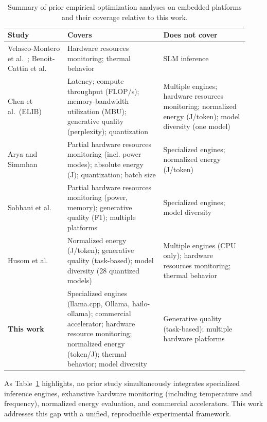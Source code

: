 \documentclass[acmsmall,natbib=false]{acmart}
\begin{document}
\begin{table}[t]
\centering
\caption{Summary of prior empirical optimization analyses on embedded
platforms and their coverage relative to this work.}
\label{tab:related}
\footnotesize
\renewcommand{\arraystretch}{1.15}
\begin{tabular}{@{}p{0.23\linewidth} p{0.37\linewidth} p{0.33\linewidth}@{}}
\toprule
\textbf{Study} & \textbf{Covers} & \textbf{Does not cover} \\
\midrule
Velasco-Montero et al.~\cite{velasco-montero_optimal_2022,
velasco-montero_relevant_2022}; Benoit-Cattin et
al.~\cite{benoit-cattin_impact_2020} &
Hardware resources monitoring; thermal behavior &
SLM inference \\
\addlinespace[2pt]
Chen et al.\ (ELIB)~\cite{chen_inference_2025} &
Latency; compute throughput (FLOP/s); memory-bandwidth utilization (MBU);
generative quality (perplexity); quantization &
Multiple engines; hardware resources monitoring; normalized energy (J/token); model diversity (one model) \\
\addlinespace[2pt]
Arya and Simmhan~\cite{11105796} &
Partial hardware resources monitoring (incl. power modes); absolute energy (J); quantization;
batch size &
Specialized engines; normalized energy (J/token) \\
\addlinespace[2pt]
Sobhani et al.~\cite{sobhani_sustainability_2025} &
Partial hardware resources monitoring (power, memory); generative quality (F1);
multiple platforms &
Specialized engines; model diversity \\
\addlinespace[2pt]
Husom et al.~\cite{husom_sustainable_2025} &
Normalized energy (J/token); generative quality (task-based);
model diversity (28 quantized models) &
Multiple engines (CPU only); hardware resources monitoring; thermal behavior \\
\midrule
\textbf{This work} &
Specialized engines (llama.cpp, Ollama, hailo-ollama); commercial
accelerator; hardware resource monitoring; normalized energy (token/J); thermal
behavior; model diversity &
Generative quality (task-based); multiple hardware platforms \\
\bottomrule
\end{tabular}
\end{table}

As Table~\ref{tab:related} highlights, no prior study
simultaneously integrates specialized inference engines, exhaustive hardware
monitoring (including temperature and frequency), normalized energy
evaluation, and commercial accelerators. This work addresses this gap with
a unified, reproducible experimental framework.
\end{document}

